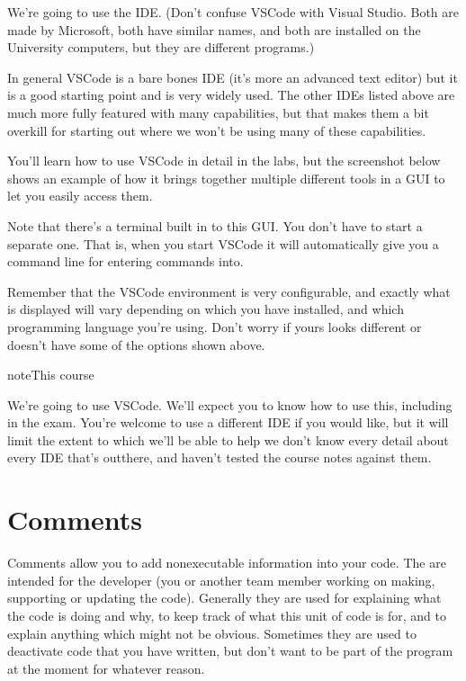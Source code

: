 \documentclass[letterpaper,10pt,british]{sphinxmanual}
\let\sphinxpxdimen\pdfpxdimen\else\newdimen\sphinxpxdimen
\begin{document}
\sphinxAtStartPar
We’re going to use the  IDE. (Don’t confuse VSCode with Visual Studio. Both are made by Microsoft, both have similar names, and both are installed on the University computers, but they are different programs.)

\sphinxAtStartPar
In general VSCode is a bare bones IDE (it’s more an advanced text editor) but it is a good starting point and is very widely used. The other IDEs listed above are much more fully featured with many capabilities, but that makes them a bit overkill for starting out where we won’t be using many of these capabilities.

\sphinxAtStartPar
You’ll learn how to use VSCode in detail in the labs, but the screenshot below shows an example of how it brings together multiple different tools in a GUI to let you easily access them.

\begin{figure}[htbp]
\centering

\noindent\sphinxincludegraphics[width=800\sphinxpxdimen]{{ide}.png}
\end{figure}

\sphinxAtStartPar
Note that there’s a terminal built in to this GUI. You don’t have to start a separate one. That is, when you start VSCode it will automatically give you a command line for entering commands into.

\sphinxAtStartPar
Remember that the VSCode environment is very configurable, and exactly what is displayed will vary depending on which  you have installed, and which programming language you’re using. Don’t worry if yours looks different or doesn’t have some of the options shown above.

\begin{sphinxadmonition}{note}{This course}

\sphinxAtStartPar
We’re going to use VSCode. We’ll expect you to know how to use this, including in the exam. You’re welcome to use a different IDE if you would like, but it will limit the extent to which we’ll be able to help \sphinxhyphen{} we don’t know every detail about every IDE that’s out\sphinxhyphen{}there, and haven’t tested the course notes against them.
\end{sphinxadmonition}

\sphinxstepscope


\section{Comments}
\label{\detokenize{chapters/software_development_tools/comments:comments}}\label{\detokenize{chapters/software_development_tools/comments::doc}}
\sphinxAtStartPar
Comments allow you to add non\sphinxhyphen{}executable information into your code. The are intended for the developer (you or another team member working on making, supporting or updating the code). Generally they are used for explaining what the code is doing and why, to keep track of what this unit of code is for, and to explain anything which might not be obvious. Sometimes they are used to deactivate code that you have written, but don’t want to be part of the program at the moment for whatever reason.
\end{document}
